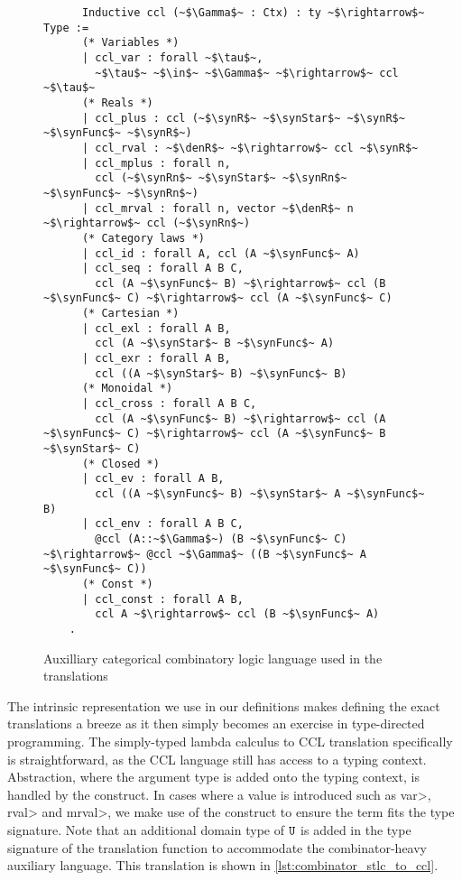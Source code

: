   \begin{figure}[]
    \centering
    \begin{verbatim}
      Inductive ccl (~$\Gamma$~ : Ctx) : ty ~$\rightarrow$~ Type :=
      (* Variables *)
      | ccl_var : forall ~$\tau$~,
        ~$\tau$~ ~$\in$~ ~$\Gamma$~ ~$\rightarrow$~ ccl ~$\tau$~
      (* Reals *)
      | ccl_plus : ccl (~$\synR$~ ~$\synStar$~ ~$\synR$~ ~$\synFunc$~ ~$\synR$~)
      | ccl_rval : ~$\denR$~ ~$\rightarrow$~ ccl ~$\synR$~
      | ccl_mplus : forall n,
        ccl (~$\synRn$~ ~$\synStar$~ ~$\synRn$~ ~$\synFunc$~ ~$\synRn$~)
      | ccl_mrval : forall n, vector ~$\denR$~ n ~$\rightarrow$~ ccl (~$\synRn$~)
      (* Category laws *)
      | ccl_id : forall A, ccl (A ~$\synFunc$~ A)
      | ccl_seq : forall A B C,
        ccl (A ~$\synFunc$~ B) ~$\rightarrow$~ ccl (B ~$\synFunc$~ C) ~$\rightarrow$~ ccl (A ~$\synFunc$~ C)
      (* Cartesian *)
      | ccl_exl : forall A B,
        ccl (A ~$\synStar$~ B ~$\synFunc$~ A)
      | ccl_exr : forall A B,
        ccl ((A ~$\synStar$~ B) ~$\synFunc$~ B)
      (* Monoidal *)
      | ccl_cross : forall A B C,
        ccl (A ~$\synFunc$~ B) ~$\rightarrow$~ ccl (A ~$\synFunc$~ C) ~$\rightarrow$~ ccl (A ~$\synFunc$~ B ~$\synStar$~ C)
      (* Closed *)
      | ccl_ev : forall A B,
        ccl ((A ~$\synFunc$~ B) ~$\synStar$~ A ~$\synFunc$~ B)
      | ccl_env : forall A B C,
        @ccl (A::~$\Gamma$~) (B ~$\synFunc$~ C) ~$\rightarrow$~ @ccl ~$\Gamma$~ ((B ~$\synFunc$~ A ~$\synFunc$~ C))
      (* Const *)
      | ccl_const : forall A B,
        ccl A ~$\rightarrow$~ ccl (B ~$\synFunc$~ A)
    .
    \end{verbatim}
    \caption{Auxilliary categorical combinatory logic language used in the translations}
    \label{fig:combinator_ccl_lang}
  \end{figure}

  The intrinsic representation we use in our definitions makes defining the exact translations a breeze as it then simply becomes an exercise in type-directed programming.
  The simply-typed lambda calculus to CCL translation specifically is straightforward, as the CCL language still has access to a typing context.
  Abstraction, where the argument type is added onto the typing context, is handled by the \cclenv construct.
  In cases where a value is introduced such as \<var>, \<rval> and \<mrval>, we make use of the \cclconst construct to ensure the term fits the type signature.
  Note that an additional domain type of $\texttt{U}$ is added in the type signature of the translation function to accommodate the combinator-heavy auxiliary language.
  This translation is shown in \cref{lst:combinator_stlc_to_ccl}.

